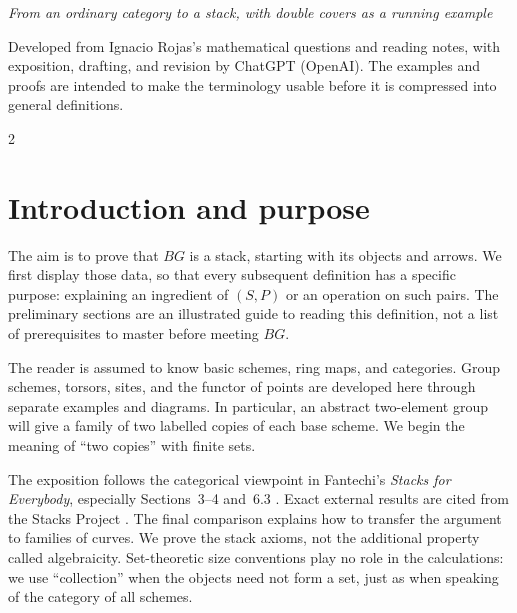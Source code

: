 \documentclass[12pt]{memoir}
\author{Ignacio Rojas\\[0.4ex]ChatGPT (OpenAI)}
\begin{document}
\maketitle
\begin{center}
\emph{From an ordinary category to a stack, with double covers as a running example}
\par\bigskip
\begin{minipage}{0.8\textwidth}
\small\centering
Developed from Ignacio Rojas's mathematical questions and reading notes,
with exposition, drafting, and revision by ChatGPT (OpenAI).
The examples and proofs are intended to make the terminology usable
before it is compressed into general definitions.
\end{minipage}
\end{center}
\clearpage
\tableofcontents*
\clearpage
\begin{multicols}{2}
\raggedcolumns

\section{Introduction and purpose}\label{sec:intro}

The aim is to prove that $BG$ is a stack, starting with its objects and
arrows. We first display those data, so that every subsequent definition
has a specific purpose: explaining an ingredient of $(S,P)$ or an
operation on such pairs. The preliminary sections are an illustrated
guide to reading this definition, not a list of prerequisites to master
before meeting $BG$.

The reader is assumed to know basic schemes, ring maps, and categories.
Group schemes, torsors, sites, and the functor of points are developed
here through separate examples and diagrams. In particular, an abstract
two-element group will give a family of two labelled copies of each
base scheme. We begin the meaning of ``two copies'' with finite sets.

The exposition follows the categorical viewpoint in Fantechi's
\emph{Stacks for Everybody}, especially Sections~3--4 and~6.3
\cite{Fantechi}. Exact external results are cited from the Stacks Project
\cite{Stacks}. The final comparison explains how to transfer the argument
to families of curves. We prove the stack axioms, not the additional
property called algebraicity. Set-theoretic size conventions play no
role in the calculations: we use ``collection'' when the objects need
not form a set, just as when speaking of the category of all schemes.


\end{multicols}
\end{document}
